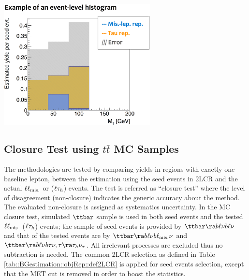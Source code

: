 \begin{center}
\includegraphics[width=80mm]{figures/BGestimation/ObjReplacement/method/evtLevel_histogram.eps}
\label{fig::BGestimation::objRep::evtLevelHist}
\end{center}


\clearpage
\subsection{Closure Test using $t\bar{t}$ MC Samples} \label{sec::BGestimation::objRep::mcClosure} 
The methodologies are tested by comparing yields in regions with exactly one baseline lepton, between the estimation using the seed events in 2LCR and the actual $\ell\ell_{\mathrm{mis.}}$ or ($\ell\tau_h$) events. 
The test is referred as ``closure test'' where the level of disagreement (non-closure) indicates the generic accuracy about the method. The evaluated non-closure is assigned as systematics uncertainty. 
In the MC closure test, simulated $\ttbar$ sample is used in both seed events and the tested $\ell\ell_{\mathrm{mis.}}$ ($\ell\tau_h$) events; 
the sample of seed events is provided by $\ttbar \ra b\ell\nu b\ell\nu$ and that of the tested events are by $\ttbar \ra b\ell\nu b \ell_{\mathrm{mis.}} \nu$ and $\ttbar \ra b\ell\nu b \tau \nu, \tau\ra\tau_h\nu_{\tau}$. All irrelevant processes are excluded thus no subtraction is needed.
The common 2LCR selection as defined in Table \ref{tab::BGestimation::objRep::def2LCR} is applied for seed events selection, except that the MET cut is removed in order to boost the statistics. \\

